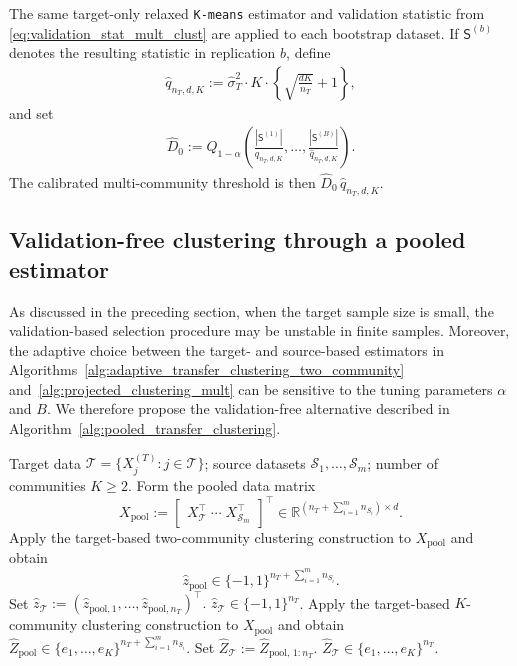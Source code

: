 \documentclass[10pt]{article}
\newcommand{\R}{\mathbb R}
\newcommand{\wh}{\widehat}
\newcommand{\calT}{\mathcal T}
\newcommand{\trg}{T}
\newcommand{\nT}{n_{\trg}}
\newcommand{\Xtar}{X^{(\trg)}}
\newcommand{\calS}{\mathcal S}
\newcommand{\src}{S}
\newcommand{\nSm}[1]{n_{\src_{#1}}}
\begin{document}
The same target-only relaxed \texttt{K-means} estimator and validation statistic from \eqref{eq:validation_stat_mult_clust} are applied to each bootstrap dataset. If $\mathsf S^{(b)}$ denotes the resulting statistic in replication $b$, define
\begin{align}
\label{eq:bootstrap_multicluster_scale}
\wh q_{\nT,d,K}:=\wh\sigma_T^2\cdot K \cdot\left\{\sqrt{\frac{dK}{\nT}}+1\right\},
\end{align}
and set
\begin{align}
\label{eq:bootstrap_D0}
\wh D_0:=\wh Q_{1-\alpha}\left(\frac{|\mathsf S^{(1)}|}{\wh q_{\nT,d,K}},\ldots,\frac{|\mathsf S^{(B)}|}{\wh q_{\nT,d,K}}\right).
\end{align}
The calibrated multi-community threshold is then
$\wh D_0\,\wh q_{\nT,d,K}$.

\subsection{Validation-free clustering through a pooled estimator} 
\label{sec:pooled_concat} 
As discussed in the preceding section, when the target sample size is small, the validation-based selection procedure may be unstable in finite samples. Moreover, the adaptive choice between the target- and source-based estimators in Algorithms~\ref{alg:adaptive_transfer_clustering_two_community} and~\ref{alg:projected_clustering_mult} can be sensitive to the tuning parameters $\alpha$ and $B$. We therefore propose the validation-free alternative described in Algorithm~\ref{alg:pooled_transfer_clustering}.

\begin{algorithm}[tb]
\caption{Pooled Transfer-Assisted Clustering}
\label{alg:pooled_transfer_clustering}
\begin{algorithmic}[1]
\Require Target data
$\calT=\{\Xtar_j:j\in\calT\}$; source datasets
$\calS_1,\ldots,\calS_m$; number of communities $K\geq 2$.
\State Form the pooled data matrix
\[
    X_{\mathrm{pool}}
    :=
    \begin{bmatrix}
        X^\top_{\calT}\;\cdots\;X^\top_{\calS_m}
    \end{bmatrix}^\top\in\R^{(\nT+\sum_{i=1}^m\nSm{i})\times d}.
\]
    \State Apply the target-based two-community clustering construction
    to $X_{\mathrm{pool}}$ and obtain
    \[
        \wh z_{\mathrm{pool}}
        \in
        \{-1,1\}^{\nT+\sum_{i=1}^m\nSm{i}}.
    \]
    \State Set $\wh z_{\calT}:= (\wh z_{\mathrm{pool},1},\ldots,
        \wh z_{\mathrm{pool},\nT})^\top.$
     $\wh z_{\calT}\in\{-1,1\}^{\nT}$.
\Else
    \State Apply the target-based $K$-community clustering construction
    to $X_{\mathrm{pool}}$ and obtain $\wh Z_{\mathrm{pool}} \in \{e_1,\ldots,e_K\}^{\nT+\sum_{i=1}^m\nSm{i}}.$
    \State Set $\wh Z_{\calT}:=\wh Z_{\mathrm{pool},\,1:\nT}.$
    $\wh Z_{\calT}\in\{e_1,\ldots,e_K\}^{\nT}$.
\EndIf
\end{algorithmic}
\end{algorithm}
\end{document}
